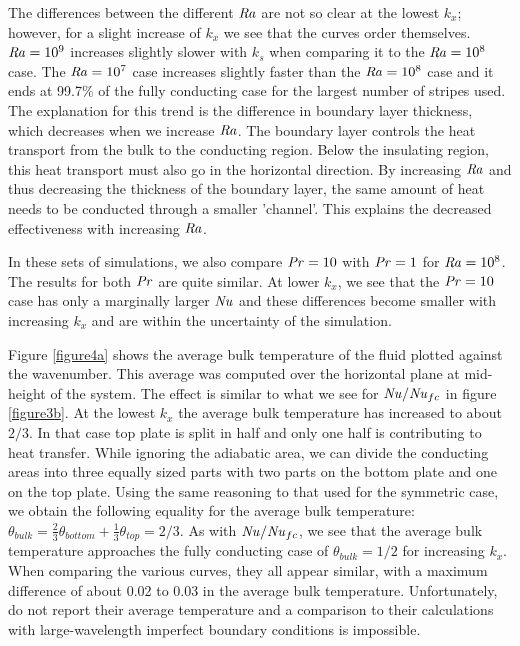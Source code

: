 \documentclass{jfm}
\newcommand\Pran{\mbox{\textit{Pr}}} %
\newcommand\Ray{\mbox{\textit{Ra}}}  %
\newcommand\Nus{\mbox{\textit{Nu}}}  %
\begin{document}
The differences between the different $\Ray$ are not so clear at the lowest
$k_x$; however, for a slight increase of $k_x$ we see that the curves order
themselves.  $\Ray = 10^9$ increases slightly slower with $k_s$ when comparing
it to the $\Ray = 10^8$ case.  The $\Ray = 10^7$ case increases slightly
faster than the $\Ray = 10^8$ case and it ends at 99.7\% of the fully
conducting case for the largest number of stripes used.  The explanation for
this trend is the difference in boundary layer thickness, which decreases when
we increase $\Ray$.  The boundary layer controls the heat transport from the
bulk to the conducting region.  Below the insulating region, this heat
transport must also go in the horizontal direction.  By increasing $\Ray$ and
thus decreasing the thickness of the boundary layer, the same amount of heat
needs to be conducted through a smaller 'channel'.  This explains the
decreased effectiveness with increasing $\Ray$.

In these sets of simulations, we also compare $\Pran = 10$ with $\Pran = 1$
for $\Ray = 10^8$.  The results for both $\Pran$ are quite similar.  At lower
$k_x$, we see that the $\Pran =10$ case has only a marginally larger $\Nus$
and these differences become smaller with increasing $k_x$ and are within the
uncertainty of the simulation.

%
%
Figure \ref{figure4a} shows the average bulk temperature of the fluid plotted
against the wavenumber.  This average was computed over the horizontal plane
at mid-height of the system.  The effect is similar to what we see for
$\Nus/\Nus_{fc}$ in figure \ref{figure3b}.  At the lowest $k_x$ the average
bulk temperature has increased to about $2/3$.  In that case top plate is
split in half and only one half is contributing to heat transfer.  While
ignoring the adiabatic area, we can divide the conducting areas into three
equally sized parts with two parts on the bottom plate and one on the top
plate.  Using the same reasoning to that used for the symmetric case, we
obtain the following equality for the average bulk temperature: $\theta_{bulk}
= \frac{2}{3} \theta_{bottom} + \frac{1}{3} \theta_{top} = 2/3$.  As with
$\Nus/\Nus_{fc}$, we see that the average bulk temperature approaches the
fully conducting case of $\theta_{bulk}=1/2$ for increasing $k_x$.  When
comparing the various curves, they all appear similar, with a maximum
difference of about 0.02 to 0.03 in the average bulk temperature.
Unfortunately, \cite{wang17} do not report their average
temperature and a comparison to their calculations with large-wavelength
imperfect boundary conditions is impossible.
\end{document}

